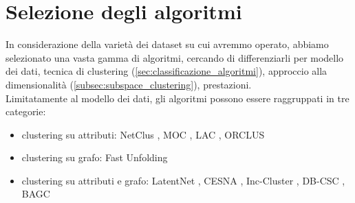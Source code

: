 \section{Selezione degli algoritmi}
\label{selezione_algoritmi}
In considerazione della variet\`a dei dataset su cui avremmo operato, abbiamo selezionato una vasta gamma di algoritmi, cercando di differenziarli per modello dei dati, tecnica di clustering (\ref{sec:classificazione_algoritmi}), approccio alla dimensionalit\`a (\ref{subsec:subspace_clustering}), prestazioni.\\
Limitatamente al modello dei dati, gli algoritmi possono essere raggruppati in tre categorie:
\begin{itemize}
\item clustering su attributi: NetClus \cite{netclus}, MOC \cite{moc}, LAC \cite{lac}, ORCLUS \cite{orclus}
\item clustering su grafo: Fast Unfolding \cite{blondel2008fuc}
\item clustering su attributi e grafo: LatentNet \cite{handcock07}, CESNA \cite{cesna}, Inc-Cluster \cite{inc_cluster}, DB-CSC \cite{db_csc}, BAGC \cite{bagc}
\end{itemize}
